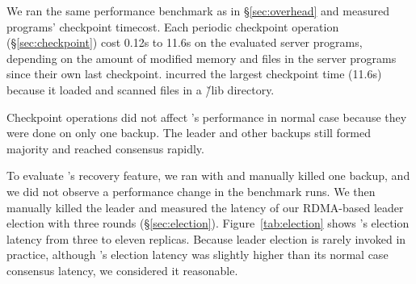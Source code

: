 

We ran the same performance benchmark as in \S\ref{sec:overhead} and measured 
programs' checkpoint timecost. Each \xxx periodic checkpoint operation 
(\S\ref{sec:checkpoint}) cost 0.12s to 11.6s on the evaluated server programs, 
depending on the amount of modified memory and files in the server programs 
since their own last checkpoint. \clamav incurred the largest checkpoint time 
(11.6s) because it loaded and scanned files in a \v{/lib} directory.

Checkpoint operations did not affect \xxx's performance in normal case because 
they were done on only one backup. The leader and other backups still formed 
majority and reached consensus rapidly.

To evaluate \xxx's \paxos recovery feature, we ran \xxx with \redis and 
manually killed one backup, and we did not observe a performance change in the 
benchmark runs. We then manually killed the \xxx leader and measured the 
latency of our RDMA-based leader election with three rounds 
(\S\ref{sec:election}). Figure~\ref{tab:election} shows \xxx's election latency 
from three to eleven replicas. Because \paxos leader election is rarely 
invoked in practice, although \xxx's election latency was slightly higher than 
its normal case consensus latency, we considered it reasonable.




